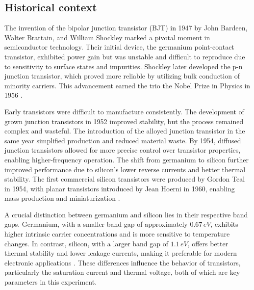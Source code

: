 \documentclass[12pt,letterpaper,twocolumn]{article}
\begin{document}
\subsection{Historical context}


The invention of the bipolar junction transistor (BJT) in 1947 by John Bardeen, Walter Brattain, and William Shockley marked a pivotal moment in semiconductor technology. Their initial device, the germanium point-contact transistor, exhibited power gain but was unstable and difficult to reproduce due to sensitivity to surface states and impurities. Shockley later developed the p-n junction transistor, which proved more reliable by utilizing bulk conduction of minority carriers. This advancement earned the trio the Nobel Prize in Physics in 1956 \cite{Lukasiak}.

Early transistors were difficult to manufacture consistently. The development of grown junction transistors in 1952 improved stability, but the process remained complex and wasteful. The introduction of the alloyed junction transistor in the same year simplified production and reduced material waste. By 1954, diffused junction transistors allowed for more precise control over transistor properties, enabling higher-frequency operation. The shift from germanium to silicon further improved performance due to silicon's lower reverse currents and better thermal stability. The first commercial silicon transistors were produced by Gordon Teal in 1954, with planar transistors introduced by Jean Hoerni in 1960, enabling mass production and miniaturization \cite{Lukasiak}.

A crucial distinction between germanium and silicon lies in their respective band gaps. Germanium, with a smaller band gap of approximately \(0.67\,eV\), exhibits higher intrinsic carrier concentrations and is more sensitive to temperature changes. In contrast, silicon, with a larger band gap of \(1.1\,eV\), offers better thermal stability and lower leakage currents, making it preferable for modern electronic applications \cite{Collings1980}. These differences influence the behavior of transistors, particularly the saturation current and thermal voltage, both of which are key parameters in this experiment.
\end{document}
